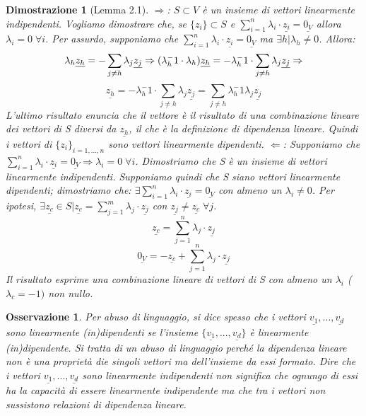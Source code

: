 \documentclass[12pt]{article}
\newenvironment{para}{\begin{adjustwidth}{13mm}{}}{\end{adjustwidth}}
\newtheorem{Dimostrazione}{Dimostrazione}[subsection]
\newtheorem{Osservazione}{Osservazione}[subsection]
\begin{document}
\begin{para}
\begin{Dimostrazione}[Lemma 2.1]\; \newline
$\Rightarrow$: $S \subset V$ è un insieme di vettori linearmente indipendenti. Vogliamo dimostrare che, se $\{z_i\}\subset S$ e $\sum_{i=1}^n{\lambda_i \cdot \underline{z_i}}=\underline{0_V}$ allora $\lambda_i = 0 \; \forall i$. Per assurdo, supponiamo che $\sum_{i=1}^n{\lambda_i \cdot \underline{z_i}}=\underline{0_V}$ ma $\exists h| \lambda_h \neq 0$. Allora:
$$\lambda_h \underline{z_h} = -\sum_{j\neq h} {\lambda_j \underline{z_j}} \Rightarrow \newline
(\lambda_h ^-1 \cdot \lambda_h)\underline{z_h} = -\lambda_h^-1 \cdot \sum_{j\neq h} {\lambda_j \underline{z_j}} \Rightarrow$$
$$\underline{z_h} = -\lambda_h^-1 \cdot \sum_{j\neq h} {\lambda_j \underline{z_j}} = \sum_{j\neq h} {\lambda_h^-1\lambda_j \underline{z_j}}$$
L'ultimo risultato enuncia che il vettore è il risultato di una combinazione lineare dei vettori di S diversi da $\underline{z_h}$, il che è la definizione di dipendenza lineare. Quindi i vettori di $\{z_i\}_{i = 1,...,n}$ sono vettori linearmente dipendenti. \newline
$\Leftarrow$: Supponiamo che $\sum_{i=1}^n{\lambda_i \cdot \underline{z_i}}=\underline{0_V} \Rightarrow \lambda_i = 0 \; \forall i$. Dimostriamo che S è un insieme di vettori linearmente indipendenti. Supponiamo quindi che S siano vettori linearmente dipendenti; dimostriamo che:
$\exists \sum_{i=1}^n{\lambda_i \cdot \underline{z_i}}=\underline{0_V}$ con almeno un $\lambda_i \neq 0$. Per ipotesi, $\exists \underline{z_c} \in S | \underline{z_c} = \sum_{j=1}^m{\lambda_j \cdot \underline{z_j}}$ con $\underline{z_j} \neq \underline{z_c} \; \forall j$.
$$\underline{z_c} = \sum_{j=1}^n{\lambda_j \cdot \underline{z_j}}$$
$$\underline{0_V} = - \underline{z_c} + \sum_{j=1}^n{\lambda_j \cdot \underline{z_j}}$$
Il risultato esprime una combinazione lineare di vettori di S con almeno un $\lambda _i$ ($\lambda_c = -1)$
non nullo.
\end{Dimostrazione}
\begin{Osservazione}
Per abuso di linguaggio, si dice spesso che i vettori $\underline{v_1},...,\underline{v_d}$ sono linearmente (in)dipendenti se l'insieme $\{\underline{v_1},...,\underline{v_d}\}$ è linearmente (in)dipendente. Si tratta di un abuso di linguaggio perché la dipendenza lineare non è una proprietà die singoli vettori ma dell'insieme da essi formato. Dire che i vettori $\underline{v_1},...,\underline{v_d}$ sono linearmente indipendenti non significa che ognungo di essi ha la capacità di essere linearmente indipendente ma che tra i vettori non sussistono relazioni di dipendenza lineare.
\end{Osservazione}


\end{para}
\end{document}
